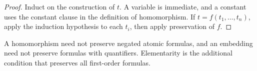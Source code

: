 \begin{proof}
Induct on the construction of \(t\).  A variable is immediate, and a constant
uses the constant clause in the definition of homomorphism.  If
\(t=f(t_1,\ldots,t_n)\), apply the induction hypothesis to each \(t_i\), then
apply preservation of \(f\).
\end{proof}

\begin{warning}
A homomorphism need not preserve negated atomic formulas, and an embedding need
not preserve formulas with quantifiers.  Elementarity is the additional
condition that preserves all first-order formulas.
\end{warning}

